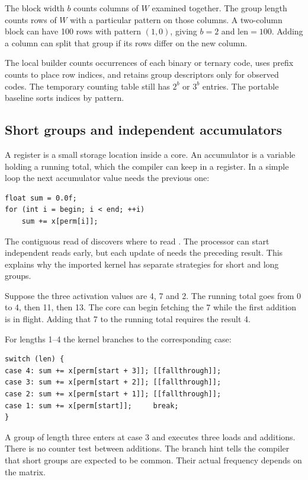 \documentclass[11pt,a4paper]{article}
\newcommand{\code}[1]{\texttt{\detokenize{#1}}}
\begin{document}
The block width \(b\) counts columns of \(W\) examined together.
The group length \code{len = end - start} counts rows of \(W\) with a
particular pattern on those columns. A two-column block can have 100 rows
with pattern \((1,0)\), giving \(b=2\) and \(\mathrm{len}=100\).
Adding a column can split that group if its rows differ on the new column.

The local builder counts occurrences of each binary or ternary code, uses
prefix counts to place row indices, and retains group descriptors only for
observed codes. The temporary counting table still has \(2^b\) or \(3^b\)
entries. The portable baseline sorts indices by pattern.

\subsection{Short groups and independent accumulators}
A register is a small storage location inside a core. An accumulator is a
variable holding a running total, which the compiler can keep in a register.
In a simple loop the next accumulator value needs the previous one:
\begin{lstlisting}
float sum = 0.0f;
for (int i = begin; i < end; ++i)
    sum += x[perm[i]];
\end{lstlisting}
The contiguous read of \code{perm[i]} discovers where to read \code{x}.
The processor can start independent reads early, but each update of
\code{sum} needs the preceding result. This explains why the imported
kernel has separate strategies for short and long groups.

Suppose the three activation values are 4, 7 and 2. The running total
goes from 0 to 4, then 11, then 13. The core can begin fetching the 7
while the first addition is in flight. Adding that 7 to the running total
requires the result 4.

For lengths 1--4 the kernel branches to the corresponding case:
\begin{lstlisting}
switch (len) {
case 4: sum += x[perm[start + 3]]; [[fallthrough]];
case 3: sum += x[perm[start + 2]]; [[fallthrough]];
case 2: sum += x[perm[start + 1]]; [[fallthrough]];
case 1: sum += x[perm[start]];     break;
}
\end{lstlisting}
A group of length three enters at case 3 and executes three loads and
additions. There is no counter test between additions. The branch hint
\code{__builtin_expect(len <= 4, 1)} tells the compiler that short groups
are expected to be common. Their actual frequency depends on the matrix.
\end{document}
